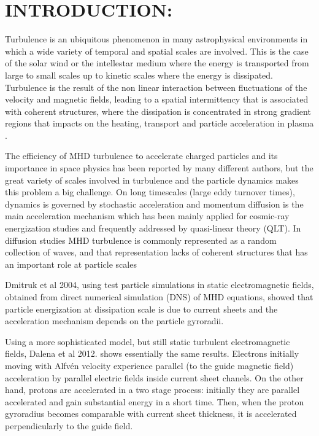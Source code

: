 \documentclass[%
aip,pop,amsmath,amssymb,
 reprint,%
]{revtex4-1}
\begin{document}
\section{\label{sec:level1}INTRODUCTION:}
Turbulence is an ubiquitous phenomenon in many astrophysical 
environments in which a wide  
variety of temporal and spatial scales are involved. This is the case of 
the solar wind or the 
intellestar medium where the energy is transported from 
large to small scales up to 
kinetic scales where the energy is dissipated. 
Turbulence is the result of the  non linear 
interaction between fluctuations of the velocity and magnetic fields, 
leading to a 
spatial intermittency that is associated with coherent structures,
 where the dissipation is 
concentrated in strong gradient regions that impacts on the heating, 
transport and particle 
acceleration in plasma \cite{M1}.

The efficiency of MHD turbulence to accelerate charged particles 
and its importance in space 
physics has been reported by many different authors\cite{F1,L1,M2}, 
but the great variety of 
scales involved in turbulence and the particle dynamics
makes this problem a big challenge.
On long timescales (large eddy turnover times), dynamics is
governed by stochastic acceleration and momentum diffusion is
the main acceleration 
mechanism which has been mainly applied for cosmic-ray energization 
studies and frequently
addressed by quasi-linear theory (QLT)\cite{S1,CH1,Lange1}. 
In diffusion studies 
MHD turbulence is commonly represented as a random 
collection of waves, and that 
representation lacks of coherent structures that has an important role 
at particle scales\cite{Vlahos}

Dmitruk et al 2004\cite{PD1}, 
using test particle simulations in static electromagnetic fields, obtained 
from direct 
numerical simulation (DNS) of MHD equations, showed that particle 
energization at dissipation
scale is due to current sheets and the acceleration mechanism 
depends on the particle 
gyroradii. 

Using a more sophisticated model, but still static turbulent 
electromagnetic fields, Dalena et 
al 2012.\cite{Dalena2012} shows essentially the same results.
Electrons initially moving with 
Alfv\'en velocity experience parallel (to the guide magnetic field)
acceleration by 
parallel electric fields inside current sheet chanels. 
On the other hand, protons are accelerated in a two stage process: 
initially they are parallel accelerated and gain substantial energy 
in a short time. Then, when the proton gyroradius becomes
comparable with current sheet thickness,
it is accelerated perpendicularly to the guide field.  
\end{document}
